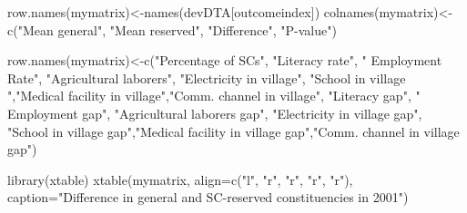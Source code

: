 \documentclass[
]{article}
\newenvironment{Shaded}{\begin{snugshade}}{\end{snugshade}}
\newcommand{\AttributeTok}[1]{\textcolor[rgb]{0.77,0.63,0.00}{#1}}
\newcommand{\FunctionTok}[1]{\textcolor[rgb]{0.00,0.00,0.00}{#1}}
\newcommand{\NormalTok}[1]{#1}
\newcommand{\OtherTok}[1]{\textcolor[rgb]{0.56,0.35,0.01}{#1}}
\newcommand{\StringTok}[1]{\textcolor[rgb]{0.31,0.60,0.02}{#1}}
\begin{document}
\begin{Shaded}
\begin{Highlighting}[]
\FunctionTok{row.names}\NormalTok{(mymatrix)}\OtherTok{\textless{}{-}}\FunctionTok{names}\NormalTok{(devDTA[outcomeindex])}
\FunctionTok{colnames}\NormalTok{(mymatrix)}\OtherTok{\textless{}{-}}\FunctionTok{c}\NormalTok{(}\StringTok{"Mean general"}\NormalTok{, }\StringTok{"Mean reserved"}\NormalTok{, }\StringTok{"Difference"}\NormalTok{, }\StringTok{"P{-}value"}\NormalTok{)}

\FunctionTok{row.names}\NormalTok{(mymatrix)}\OtherTok{\textless{}{-}}\FunctionTok{c}\NormalTok{(}\StringTok{"Percentage of SCs"}\NormalTok{, }\StringTok{"Literacy rate"}\NormalTok{, }\StringTok{" Employment Rate"}\NormalTok{, }\StringTok{"Agricultural laborers"}\NormalTok{, }\StringTok{"Electricity in village"}\NormalTok{, }\StringTok{"School in village "}\NormalTok{,}\StringTok{"Medical facility in village"}\NormalTok{,}\StringTok{"Comm. channel in village"}\NormalTok{,}
\StringTok{"Literacy gap"}\NormalTok{, }\StringTok{" Employment gap"}\NormalTok{, }\StringTok{"Agricultural laborers gap"}\NormalTok{,   }\StringTok{"Electricity in village gap"}\NormalTok{, }\StringTok{"School in village gap"}\NormalTok{,}\StringTok{"Medical facility in village gap"}\NormalTok{,}\StringTok{"Comm. channel in village gap"}\NormalTok{)}

\FunctionTok{library}\NormalTok{(xtable)}
\FunctionTok{xtable}\NormalTok{(mymatrix, }\AttributeTok{align=}\FunctionTok{c}\NormalTok{(}\StringTok{"l"}\NormalTok{, }\StringTok{"r"}\NormalTok{, }\StringTok{"r"}\NormalTok{, }\StringTok{"r"}\NormalTok{, }\StringTok{"r"}\NormalTok{), }\AttributeTok{caption=}\StringTok{"Difference in general and SC{-}reserved constituencies in 2001"}\NormalTok{)}
\end{Highlighting}
\end{Shaded}
\end{document}
